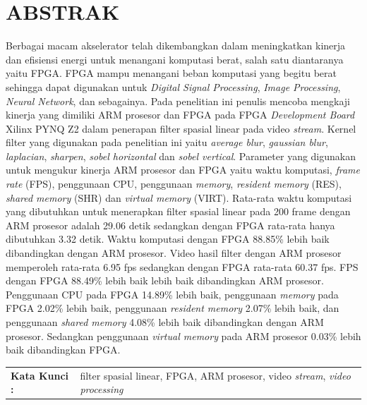 ﻿\chapter*{ABSTRAK}

Berbagai macam akselerator telah dikembangkan dalam meningkatkan kinerja dan efisiensi energi untuk menangani komputasi berat, salah satu diantaranya yaitu FPGA. FPGA mampu menangani beban komputasi yang begitu berat sehingga dapat digunakan untuk \textit{Digital Signal Processing}, \textit{Image Processing}, \textit{Neural Network}, dan sebagainya.
Pada penelitian ini penulis mencoba mengkaji kinerja yang dimiliki ARM prosesor dan FPGA pada FPGA \textit{Development Board} Xilinx PYNQ Z2 dalam penerapan filter spasial linear pada video \textit{stream}. Kernel filter yang digunakan pada penelitian ini yaitu \textit{average blur}, \textit{gaussian blur}, \textit{laplacian}, \textit{sharpen}, \textit{sobel horizontal} dan \textit{sobel vertical}. Parameter yang digunakan untuk mengukur kinerja ARM prosesor dan FPGA yaitu waktu komputasi, \textit{frame rate} (FPS), penggunaan CPU, penggunaan \textit{memory}, \textit{resident memory} (RES), \textit{shared memory} (SHR) dan \textit{virtual memory} (VIRT).
Rata-rata waktu komputasi yang dibutuhkan untuk menerapkan filter spasial linear pada 200 frame dengan ARM prosesor adalah 29.06 detik sedangkan dengan FPGA rata-rata hanya dibutuhkan 3.32 detik. Waktu komputasi dengan FPGA 88.85\% lebih baik dibandingkan dengan ARM prosesor. Video hasil filter dengan ARM prosesor memperoleh rata-rata 6.95 fps sedangkan dengan FPGA rata-rata 60.37 fps. FPS dengan FPGA 88.49\% lebih baik lebih baik dibandingkan ARM prosesor. Penggunaan CPU pada FPGA 14.89\% lebih baik, penggunaan \textit{memory} pada FPGA 2.02\% lebih baik, penggunaan \textit{resident memory} 2.07\% lebih baik, dan penggunaan \textit{shared memory} 4.08\% lebih baik dibandingkan dengan ARM prosesor. Sedangkan penggunaan \textit{virtual memory} pada ARM prosesor 0.03\% lebih baik dibandingkan FPGA.


\begin{table}[h]
    \begin{tabular}{ p{} p{} }
        \\
        \textbf{Kata Kunci :} & filter spasial linear, FPGA, ARM prosesor, video \textit{stream}, \textit{video processing}
    \end{tabular}
\end{table}

 
